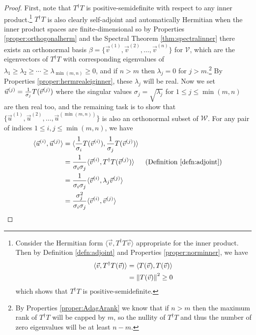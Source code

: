 \begin{proof}
First, note that $T^\dag T$ is positive-semidefinite with respect to any inner product.\footnote{\label{foot:TdagTpossemidef} Consider the Hermitian form $\langle \vec{v}, T^\dag T \vec{v} \rangle$ appropriate for the inner product. Then by Definition \ref{defn:adjoint} and Properties \ref{proper:norminner}, we have
\begin{align*}
\langle \vec{v}, T^\dag T (\vec{v}) \rangle &= \langle T (\vec{v}), T (\vec{v}) \rangle \\
&= \norm{T(\vec{v})}^2 \geq 0
\end{align*}
which shows that $T^\dag T$ is positive-semidefinite.} $T^\dag T$ is also clearly self-adjoint and automatically Hermitian when the inner product spaces are finite-dimensional so by Properties \ref{proper:orthogonalherm} and the Spectral Theorem \ref{thm:spectralinner} there exists an orthonormal basis $\beta = \{\vec{v}^{(1)}, \vec{v}^{(2)}, \ldots, \vec{v}^{(n)}\}$ for $\mathcal{V}$, which are the eigenvectors of $T^\dag T$ with corresponding eigenvalues of $\lambda_1 \geq \lambda_2 \geq \cdots \geq \lambda_{\min(m,n)} \geq 0$, and if $n > m$ then $\lambda_{j} = 0$ for $j > m$.\footnote{\label{foot:zerosingular} By Properties \ref{proper:AdagArank} we know that if $n > m$ then the maximum rank of $T^\dag T$ will be capped by $m$, so the nullity of $T^\dag T$ and thus the number of zero eigenvalues will be at least $n-m$.} By Properties \ref{proper:hermrealeiginner}, these $\lambda_j$ will be real. Now we set $\vec{u}^{(j)} = \smash{\frac{1}{\sigma_j}T(\vec{v}^{(j)})}$ where the singular values $\sigma_j = \sqrt{\lambda_j}$ for $1 \leq j \leq \min(m,n)$ are then real too, and the remaining task is to show that $\{\vec{u}^{(1)}, \vec{u}^{(2)},\ldots,\vec{u}^{(\min(m,n))}\}$ is also an orthonormal subset of $\mathcal{W}$. For any pair of indices $1 \leq i,j \leq \min(m,n)$, we have
\begin{align}
\langle \vec{u}^{(i)}, \vec{u}^{(j)} \rangle &= \langle \frac{1}{\sigma_i}T(\vec{v}^{(i)}), \frac{1}{\sigma_j}T(\vec{v}^{(j)}) \rangle \nonumber \\
&= \frac{1}{\sigma_i \sigma_j}\langle \vec{v}^{(i)}, T^\dag T(\vec{v}^{(j)}) \rangle & \text{(Definition \ref{defn:adjoint})} \nonumber \\
&= \frac{1}{\sigma_i \sigma_j}\langle \vec{v}^{(i)}, \lambda_j\vec{v}^{(j)} \rangle \nonumber \\
&= \frac{\sigma_j^2}{\sigma_i \sigma_j}\langle \vec{v}^{(i)}, \vec{v}^{(j)} \rangle \nonumber \\

\end{align}
\end{proof}
